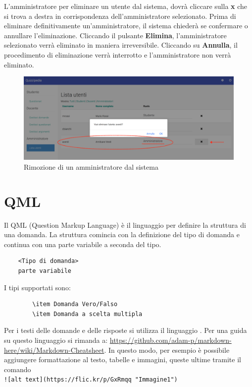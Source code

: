 \documentclass[12pt,a4paper]{article}
\begin{document}
	L'amministratore per eliminare un utente dal sistema, dovrà cliccare sulla \textbf{x} che si trova a destra in corrispondenza dell'amministratore selezionato. Prima di eliminare definitivamente un'amministratore, il sistema chiederà se confermare o annullare l'eliminazione. Cliccando il pulsante \textbf{Elimina}, l'amministratore selezionato verrà eliminato in maniera irreversibile. Cliccando su \textbf{Annulla}, il procedimento di eliminazione verrà interrotto e l'amministratore non verrà eliminato.
		\begin{figure}[H]
			\centering
			\includegraphics[width=1\linewidth]{../img/screenshot/rimozioneAmministratore.png}
			\caption{Rimozione di un amministratore dal sistema}
			\label{Rimozione di un amministratore dal sistema}
		\end{figure}
	
	\section{QML}
	Il QML (Question Markup Language) è il linguaggio per definire la struttura di una domanda. La struttura comincia con la definizione del tipo di domanda e continua con una parte variabile a seconda del tipo.\\
	\begin{verbatim}
	<Tipo di domanda>
	parte variabile
	\end{verbatim}
		
	 I tipi supportati sono:
	\begin{verbatim}
		\item Domanda Vero/Falso
		\item Domanda a scelta multipla
	\end{verbatim}
	Per i testi delle domande e delle risposte si utilizza il linguaggio . Per una guida su questo linguaggio si rimanda a: \url{https://github.com/adam-p/markdown-here/wiki/Markdown-Cheatsheet}. In questo modo, per esempio è possibile aggiungere formattazione al testo, tabelle e immagini, queste ultime tramite il comando\\
	 \texttt{![alt text](https://flic.kr/p/GxRmqq "Immagine1")}\\
		
\end{document}
